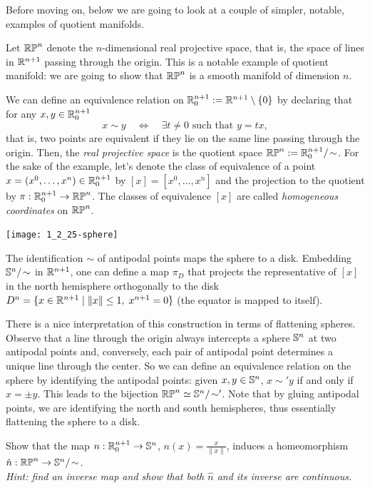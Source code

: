 Before moving on, below we are going to look at a couple of simpler, notable, examples of quotient manifolds.

\begin{example}
  Let $\mathbb{RP}^n$ denote the $n$-dimensional real projective space, that is, the space of lines in $\mathbb{R}^{n+1}$ passing through the origin.
  This is a notable example of quotient manifold: we are going to show that $\mathbb{RP}^n$ is a smooth manifold of dimension $n$. 

  We can define an equivalence relation on $\mathbb{R}^{n+1}_0:=\mathbb{R}^{n+1}\setminus\{0\}$ by declaring that for any $x,y\in \mathbb{R}^{n+1}_0$
  \begin{equation}
    x\sim y \quad\Longleftrightarrow\quad \exists t\neq 0 \mbox{ such that } y=tx,
  \end{equation}
  that is, two points are equivalent if they lie on the same line passing through the origin.
  Then, the \emph{real projective space} is the quotient space $\mathbb{RP}^n := \mathbb{R}^{n+1}_0/\!\sim$.
  For the sake of the example, let's denote the class of equivalence of a point $x=(x^0,\ldots,x^n)\in\mathbb{R}^{n+1}_0$ by $[x]=[x^0,\ldots,x^n]$ and the projection to the quotient by $\pi:\mathbb{R}^{n+1}_0\to\mathbb{RP}^n$.
  The classes of equivalence $[x]$ are called \emph{homogeneous coordinates} on $\mathbb{RP}^n$.
  
  \begin{marginfigure}
    \texttt{[image: 1\_2\_25-sphere]}
    \caption{The identification $\sim$ of antipodal points maps the sphere to a disk. Embedding $\mathbb{S}^n/\!\sim$ in $\mathbb{R}^{n+1}$, one can define a map $\pi_D$ that projects the representative of $[x]$ in the north hemisphere orthogonally to the disk $D^n = \{x\in\mathbb{R}^{n+1} \mid \|x\|\leq 1, \; x^{n+1}=0\}$ (the equator is mapped to itself). }
  \end{marginfigure}
  There is a nice interpretation of this construction in terms of flattening spheres.
  Observe that a line through the origin always intercepts a sphere $\mathbb{S}^n$ at two antipodal points and, conversely, each pair of antipodal point determines a unique line through the center.
  So we can define an equivalence relation on the sphere by identifying the antipodal points: given $x,y\in\mathbb{S}^n$, $x\sim' y$ if and only if $x = \pm y$.
  This leads to the bijection $\mathbb{RP}^n \simeq \mathbb{S}^n/\!\sim'$.
  Note that by gluing antipodal points, we are identifying the north and south hemispheres, thus essentially flattening the sphere to a disk.

  \begin{exercise}\label{exe:RPSN}
    Show that the map $n: \mathbb{R}^{n+1}_0\to \mathbb{S}^n$, $n(x) = \frac{x}{\|x\|}$, induces a homeomorphism $\hat n:\mathbb{RP}^n \to \mathbb{S}^n/\!\sim$.\\
    \textit{\small Hint: find an inverse map and show that both $\hat n$ and its inverse are continuous.}
  \end{exercise}


\end{example}
